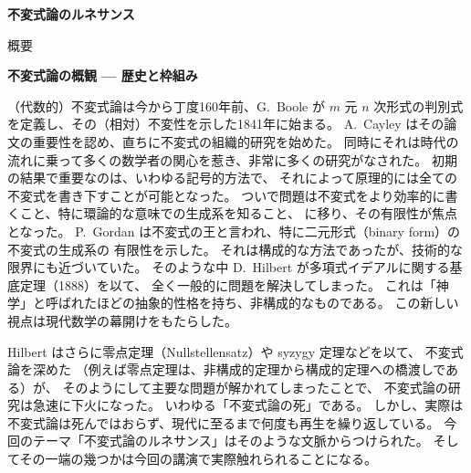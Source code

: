 \documentclass[uplatex,dvipdfmx]{jlreq}
\begin{document}
\begin{center}
  \vspace*{20pt}
  {\Huge\bfseries 不変式論のルネサンス}

  \vspace{1pc}
  {\Large 概要}
\end{center}

\vfill

\newpage

\begin{center}
  {\Large\bfseries 不変式論の概観 --- 歴史と枠組み}
\end{center}

\bigskip
\hspace*{\fill}{\large\bfseries 梅田　亨（京大・理）}

\bigskip

（代数的）不変式論は今から丁度160年前、G.~Boole が
$m$ 元 $n$ 次形式の判別式を定義し、その（相対）不変性を示した1841年に始まる。
A.~Cayley はその論文の重要性を認め、直ちに不変式の組織的研究を始めた。
同時にそれは時代の流れに乗って多くの数学者の関心を惹き、非常に多くの研究がなされた。
初期の結果で重要なのは、いわゆる記号的方法で、
それによって原理的には全ての不変式を書き下すことが可能となった。
ついで問題は不変式をより効率的に書くこと、特に環論的な意味での生成系を知ること、
に移り、その有限性が焦点となった。
P.~Gordan は不変式の王と言われ、特に二元形式（binary form）の不変式の生成系の
有限性を示した。
それは構成的な方法であったが、技術的な限界にも近づいていた。
そのような中 D.~Hilbert が多項式イデアルに関する基底定理（1888）を以て、
全く一般的に問題を解決してしまった。
これは「神学」と呼ばれたほどの抽象的性格を持ち、非構成的なものである。
この新しい視点は現代数学の幕開けをもたらした。

\medskip

Hilbert はさらに零点定理（Nullstellensatz）や syzygy 定理などを以て、
不変式論を深めた
（例えば零点定理は、非構成的定理から構成的定理への橋渡しである）が、
そのようにして主要な問題が解かれてしまったことで、
不変式論の研究は急速に下火になった。
いわゆる「不変式論の死」である。
しかし、実際は不変式論は死んではおらず、現代に至るまで何度も再生を繰り返している。
今回のテーマ「不変式論のルネサンス」はそのような文脈からつけられた。
そしてその一端の幾つかは今回の講演で実際触れられることになる。
\end{document}
